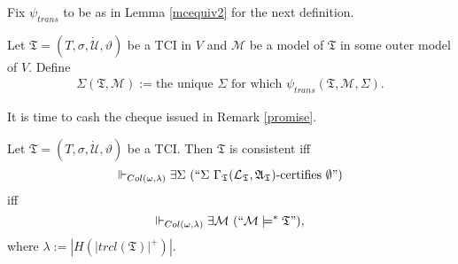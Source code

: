 \documentclass[12pt]{article}
\numberwithin{equation}{section}
\begin{document}
Fix $\psi_{trans}$ to be as in Lemma \ref{mcequiv2} for the next definition. 

\begin{defi}
Let $\mathfrak{T} = (T, \sigma, \dot{\mathcal{U}}, \vartheta)$ be a TCI in $V$ and $\mathcal{M}$ be a model of $\mathfrak{T}$ in some outer model of $V$. Define \begin{align*}
    \Sigma(\mathfrak{T}, \mathcal{M}) := \text{the unique } \Sigma \text{ for which } \psi_{trans}(\mathfrak{T}, \mathcal{M}, \Sigma).
\end{align*}
\end{defi}

It is time to cash the cheque issued in Remark \ref{promise}.

\begin{lem}\label{conalt}
Let $\mathfrak{T} = (T, \sigma, \dot{\mathcal{U}}, \vartheta)$ be a TCI. Then $\mathfrak{T}$ is consistent iff $$\Vdash_{Col(\omega, \lambda)} \exists \Sigma \ (``\Sigma \ \Gamma_{\mathfrak{T}} (\mathcal{L}_{\mathfrak{T}}, \mathfrak{A}_{\mathfrak{T}})\text{-certifies } \emptyset")$$ iff
$$\Vdash_{Col(\omega, \lambda)} \exists \mathcal{M} \ (``\mathcal{M} \models^* \mathfrak{T}"),$$ where $\lambda := |H(|trcl(\mathfrak{T})|^+)|$.
\end{lem}
\end{document}
